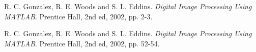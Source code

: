 \begin{thebibliography}{9}
R. C. Gonzalez, R. E. Woods and S. L. Eddins. \textit{Digital Image Processing Using MATLAB}. Prentice Hall, 2nd ed, 2002, pp. 2-3.

R. C. Gonzalez, R. E. Woods and S. L. Eddins. \textit{Digital Image Processing Using MATLAB}. Prentice Hall, 2nd ed, 2002, pp. 52-54.
\end{thebibliography}


